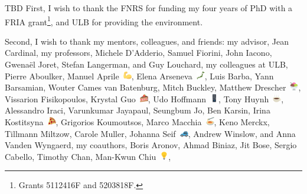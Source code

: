 
\ifdraft%
TBD
\else%
First, I wish to thank the FNRS for funding my four years of PhD with a FRIA
grant\footnote{%
Grants 5112416F and 5203818F.%
}, and ULB for providing the environment.

Second, I wish to thank my mentors, colleagues, and friends:
%
my advisor,
Jean Cardinal,
%
my professors,
Michele D'Adderio,
Samuel Fiorini,
John Iacono,
Gwenaël Joret,
Stefan Langerman,
and
Guy Louchard,
%
my colleagues at ULB,
Pierre Aboulker,
Manuel Aprile~\includegraphics[height=1em]{figures/1f4aa},
Elena Arseneva~\includegraphics[height=1em]{figures/1f5fe},
Luis Barba,
Yann Barsamian,
Wouter Cames van Batenburg,
Mitch Buckley,
Matthew Drescher~\includegraphics[height=1em]{figures/1f368},
Vissarion Fisikopoulos,
Krystal Guo~\includegraphics[height=1em]{figures/1f370},
Udo Hoffmann~\includegraphics[height=1em]{figures/1f5a5},
Tony Huynh~\includegraphics[height=1em]{figures/2615},
Alessandro Iraci,
Varunkumar Jayapaul,
Seungbum Jo,
Ben Karsin,
Irina Kostitsyna~\includegraphics[height=1em]{figures/1f355},
Grigorios Koumoutsos,
Marco Macchia~\includegraphics[height=1em]{figures/1f35d},
Keno Merckx,
Tillmann Miltzow,
Carole Muller,
Johanna Seif~\includegraphics[height=1em]{figures/1f699},
Andrew Winslow,
and
Anna Vanden Wyngaerd,
%
my coauthors,
Boris Aronov,
Ahmad Biniaz,
Jit Bose,
Sergio Cabello,
Timothy Chan,
Man-Kwun Chiu~\includegraphics[height=1em]{figures/1f4a1},
